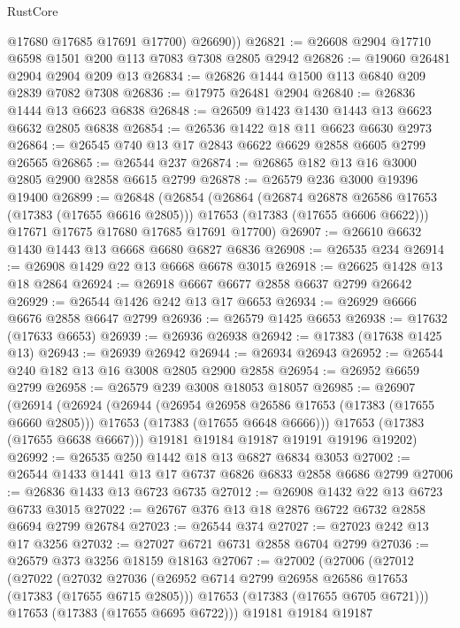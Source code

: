 \begin{lexlean}{RustCore}
\begin{coremodule}
          @17680
          @17685
          @17691
          @17700)
        @26690))
@26821 := @26608 @2904 @17710 @6598 @1501 @200 @113 @7083 @7308 @2805 @2942
@26826 := @19060 @26481 @2904 @2904 @209 @13
@26834 := @26826 @1444 @1500 @113 @6840 @209 @2839 @7082 @7308
@26836 := @17975 @26481 @2904
@26840 := @26836 @1444 @13 @6623 @6838
@26848 := @26509 @1423 @1430 @1443 @13 @6623 @6632 @2805 @6838
@26854 := @26536 @1422 @18 @11 @6623 @6630 @2973
@26864 := @26545 @740 @13 @17 @2843 @6622 @6629 @2858 @6605 @2799 @26565
@26865 := @26544 @237
@26874 := @26865 @182 @13 @16 @3000 @2805 @2900 @2858 @6615 @2799
@26878 := @26579 @236 @3000 @19396 @19400
@26899 := @26848
    (@26854
      (@26864
        (@26874 @26878 @26586 @17653 (@17383 (@17655 @6616 @2805)))
        @17653
        (@17383 (@17655 @6606 @6622)))
      @17671
      @17675
      @17680
      @17685
      @17691
      @17700)
@26907 := @26610 @6632 @1430 @1443 @13 @6668 @6680 @6827 @6836
@26908 := @26535 @234
@26914 := @26908 @1429 @22 @13 @6668 @6678 @3015
@26918 := @26625 @1428 @13 @18 @2864
@26924 := @26918 @6667 @6677 @2858 @6637 @2799 @26642
@26929 := @26544 @1426 @242 @13 @17 @6653
@26934 := @26929 @6666 @6676 @2858 @6647 @2799
@26936 := @26579 @1425 @6653
@26938 := @17632 (@17633 @6653)
@26939 := @26936 @26938
@26942 := @17383 (@17638 @1425 @13)
@26943 := @26939 @26942
@26944 := @26934 @26943
@26952 := @26544 @240 @182 @13 @16 @3008 @2805 @2900 @2858
@26954 := @26952 @6659 @2799
@26958 := @26579 @239 @3008 @18053 @18057
@26985 := @26907
    (@26914
      (@26924
        (@26944
          (@26954 @26958 @26586 @17653 (@17383 (@17655 @6660 @2805)))
          @17653
          (@17383 (@17655 @6648 @6666)))
        @17653
        (@17383 (@17655 @6638 @6667)))
      @19181
      @19184
      @19187
      @19191
      @19196
      @19202)
@26992 := @26535 @250 @1442 @18 @13 @6827 @6834 @3053
@27002 := @26544 @1433 @1441 @13 @17 @6737 @6826 @6833 @2858 @6686 @2799
@27006 := @26836 @1433 @13 @6723 @6735
@27012 := @26908 @1432 @22 @13 @6723 @6733 @3015
@27022 := @26767 @376 @13 @18 @2876 @6722 @6732 @2858 @6694 @2799 @26784
@27023 := @26544 @374
@27027 := @27023 @242 @13 @17 @3256
@27032 := @27027 @6721 @6731 @2858 @6704 @2799
@27036 := @26579 @373 @3256 @18159 @18163
@27067 := @27002
    (@27006
      (@27012
        (@27022
          (@27032
            @27036
            (@26952 @6714 @2799 @26958 @26586 @17653 (@17383 (@17655 @6715 @2805)))
            @17653
            (@17383 (@17655 @6705 @6721)))
          @17653
          (@17383 (@17655 @6695 @6722)))
        @19181
        @19184
        @19187

\end{coremodule}
\end{lexlean}
